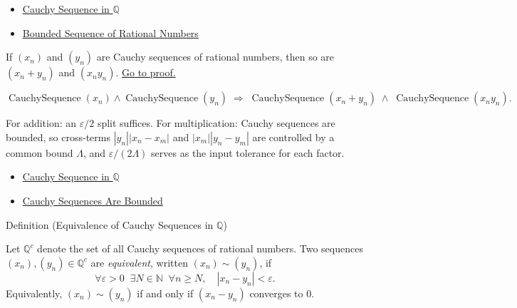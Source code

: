 \begin{dependencies}
\begin{itemize}
  \item \hyperref[def:cauchy-rational]{Cauchy Sequence in $\mathbb{Q}$}
  \item \hyperref[def:bounded-sequence-q]{Bounded Sequence of Rational Numbers}
\end{itemize}
\end{dependencies}

\begin{theorem}
\label{thm:cauchy-closed-operations-q}
If $(x_n)$ and $(y_n)$ are Cauchy sequences of rational numbers, then so
are $(x_n + y_n)$ and $(x_n y_n)$.
\hyperref[prf:cauchy-closed-operations-q]{Go to proof.}
\end{theorem}

\begin{remark*}
\[
\operatorname{CauchySequence}(x_n) \land \operatorname{CauchySequence}(y_n)
\;\Longrightarrow\;
\operatorname{CauchySequence}(x_n + y_n)
\;\land\;
\operatorname{CauchySequence}(x_n y_n).
\]
\end{remark*}

\begin{remark*}[Interpretation]
For addition: an $\varepsilon/2$ split suffices. For multiplication: Cauchy
sequences are bounded, so cross-terms $|y_n||x_n - x_m|$ and
$|x_m||y_n - y_m|$ are controlled by a common bound $\Lambda$, and
$\varepsilon/(2\Lambda)$ serves as the input tolerance for each factor.
\end{remark*}

\begin{dependencies}
\begin{itemize}
  \item \hyperref[def:cauchy-rational]{Cauchy Sequence in $\mathbb{Q}$}
  \item \hyperref[thm:cauchy-bounded-q]{Cauchy Sequences Are Bounded}
\end{itemize}
\end{dependencies}

\begin{definitionbox}{Definition (Equivalence of Cauchy Sequences in $\mathbb{Q}$)}
\begin{definition}
\label{def:cauchy-equivalence}
Let $\mathbb{Q}^c$ denote the set of all Cauchy sequences of rational numbers.
Two sequences $(x_n), (y_n) \in \mathbb{Q}^c$ are \emph{equivalent}, written
$(x_n) \sim (y_n)$, if
\[
\forall \varepsilon > 0 \;\; \exists N \in \mathbb{N} \;\; \forall n \geq N,
\quad |x_n - y_n| < \varepsilon.
\]
Equivalently, $(x_n) \sim (y_n)$ if and only if $(x_n - y_n)$ converges to $0$.
\end{definition}
\end{definitionbox}

